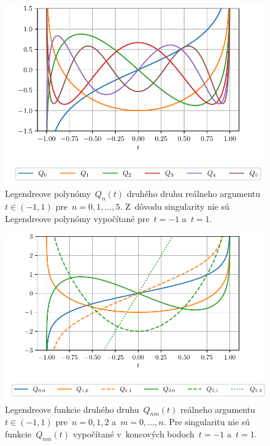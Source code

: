 \documentclass[a4paper, 12pt]{book}
\begin{document}
\begin{figure}
\centering
\includegraphics{./fig-legendre-polynomials-qn.pdf}
\caption{Legendreove polynómy~$Q_n(t)$ druhého druhu reálneho argumentu $t \in 
(-1, 1)$ pre~$n = 0, 1, \dots, 5$.  Z~dôvodu singularity nie sú Legendreove 
polynómy vypočítané pre~$t = -1$ a~$t = 1$.}
\label{fig:lp_2nd}
\end{figure}

\begin{figure}
\centering
\includegraphics{./fig-legendre-functions-qnm.pdf}
\caption{Legendreove funkcie druhého druhu~$Q_{nm}(t)$ reálneho argumentu $t 
\in (-1, 1)$ pre~$n = 0, 1, 2$ a~$m = 0, \dots, n$.  Pre singularitu nie sú 
funkcie~$Q_{nm}(t)$ vypočítané v~koncových bodoch~$t = -1$ a~$t = 1$.}
\label{fig:lf_2nd}
\end{figure}
\end{document}
